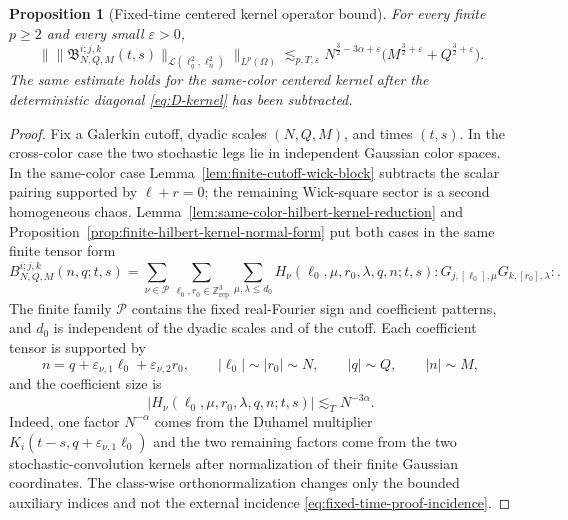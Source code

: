 \documentclass[10pt]{amsart}
\numberwithin{equation}{section}
\theoremstyle{plain}
\newtheorem{proposition}[theorem]{Proposition}
\theoremstyle{definition}
\theoremstyle{remark}
\newcommand{\eps}{\varepsilon}
\begin{document}
\begin{proposition}[Fixed-time centered kernel operator bound]\label{prop:fixed-time-centered-kernel}
For every finite $p\ge2$ and every small $\eps>0$,
\begin{equation}
\bigl\|\bigl\|\mathfrak B_{N,Q,M}^{i;j,k}(t,s)\bigr\|_{\mathcal L(\ell^2_q,\ell^2_n)}\bigr\|_{L^p(\Omega)}
 \lesssim_{p,T,\eps}
 N^{\frac32-3\alpha+\eps}\bigl(M^{\frac32+\eps}+Q^{\frac32+\eps}\bigr).
\label{eq:fixed-time-centered-kernel}
\end{equation}
The same estimate holds for the same-color centered kernel after the deterministic diagonal \eqref{eq:D-kernel} has been subtracted.
\end{proposition}

\begin{proof}
Fix a Galerkin cutoff, dyadic scales $(N,Q,M)$, and times $(t,s)$.  In the cross-color case the two stochastic legs lie in independent Gaussian color spaces.  In the same-color case Lemma~\ref{lem:finite-cutoff-wick-block} subtracts the scalar pairing supported by $\ell+r=0$; the remaining Wick-square sector is a second homogeneous chaos.  Lemma~\ref{lem:same-color-hilbert-kernel-reduction} and Proposition~\ref{prop:finite-hilbert-kernel-normal-form} put both cases in the same finite tensor form
\begin{equation}\label{eq:fixed-time-proof-normal-form}
        B_{N,Q,M}^{i;j,k}(n,q;t,s)
        =\sum_{\nu\in\mathcal P}
        \sum_{\ell_0,r_0\in\mathbb Z^3_{\mathrm{rep}}}
        \sum_{\mu,\lambda\le d_0}
        H_\nu(\ell_0,\mu,r_0,\lambda,q,n;t,s)
        :G_{j,[\ell_0],\mu}G_{k,[r_0],\lambda}: .
\end{equation}
The finite family $\mathcal P$ contains the fixed real-Fourier sign and coefficient patterns, and $d_0$ is independent of the dyadic scales and of the cutoff.  Each coefficient tensor is supported by
\begin{equation}\label{eq:fixed-time-proof-incidence}
        n=q+\varepsilon_{\nu,1}\ell_0
            +\varepsilon_{\nu,2}r_0,
        \qquad |\ell_0|\sim |r_0|\sim N,
        \qquad |q|\sim Q,
        \qquad |n|\sim M,
\end{equation}
and the coefficient size is
\begin{equation}\label{eq:fixed-time-proof-amplitude}
        |H_\nu(\ell_0,\mu,r_0,\lambda,q,n;t,s)|
        \lesssim_T N^{-3\alpha}.
\end{equation}
Indeed, one factor $N^{-\alpha}$ comes from the Duhamel multiplier $K_i(t-s,q+\varepsilon_{\nu,1}\ell_0)$ and the two remaining factors come from the two stochastic-convolution kernels after normalization of their finite Gaussian coordinates.  The class-wise orthonormalization changes only the bounded auxiliary indices and not the external incidence \eqref{eq:fixed-time-proof-incidence}.


\end{proof}
\end{document}
